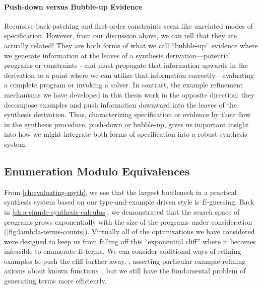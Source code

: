 \paragraph{Push-down versus Bubble-up Evidence}
Recursive back-patching and first-order constraints seem like unrelated modes of specification.
However, from our discussion above, we can tell that they are actually related!
They are both forms of what we call ``bubble-up`` evidence where we generate information at the leaves of a synthesis derivation---potential programs or constraints---and must propagate that information upwards in the derivation to a point where we can utilize that information correctly---evaluating a complete program or invoking a solver.
In contrast, the example refinement mechanisms we have developed in this thesis work in the opposite direction: they decompose examples and push information downward into the leaves of the synthesis derivation.
Thus, characterizing specification or evidence by their flow in the synthesis procedure, push-down or bubble-up, gives us important insight into how we might integrate both forms of specification into a robust synthesis system.

\subsection{Enumeration Modulo Equivalences}
\label{subsec:enumeration-modulo-equivalences}

From \autoref{ch:evaluating-myth}, we see that the largest bottleneck in a practical synthesis system based on our type-and-example driven style is $E$-guessing.
Back in \autoref{ch:a-simple-synthesis-calculus}, we demonstrated that the search space of programs grows exponentially with the size of the programs under consideration (\autoref{fig:lambda-terms-counts}).
Virtually all of the optimizations we have considered were designed to keep us from falling off this ``exponential cliff'' where it becomes infeasible to enumerate $E$-terms.
We can consider additional ways of refining examples to push the cliff further away, \eg, asserting particular example-refining axioms about known functions~\citep{feser-pldi-2015}, but we still have the fundamental problem of generating terms more efficiently.

